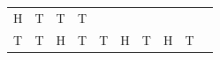 {\begin{center}
\begin{xtabular*}{\mytablewidth}[t]{|p{10\mystarwidth}|p{10\mystarwidth}|p{10\mystarwidth}|p{10\mystarwidth}|p{10\mystarwidth}|p{10\mystarwidth}|p{10\mystarwidth}|p{10\mystarwidth}|p{10\mystarwidth}|p{10\mystarwidth}|}
        H &
        T &
        T &
        T%
     \tabularnewline{}
        T &
        T &
        H &
        T &
        T &
        H &
        T &
        H &
        T &

\end{xtabular*}
\end{center}}
